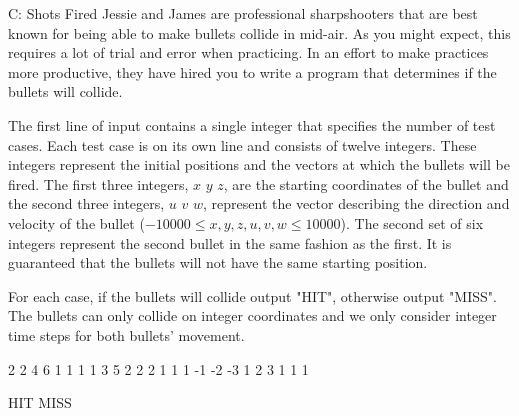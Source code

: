 \begin{problem}{C: Shots Fired}
Jessie and James are professional sharpshooters that are best known for being able to make bullets collide in mid-air.
As you might expect, this requires a lot of trial and error when practicing.
In an effort to make practices more productive, they have hired you to write a program that determines if the bullets will collide.
\end{problem}

\begin{formalin}
The first line of input contains a single integer that specifies the number of test cases.
Each test case is on its own line and consists of twelve integers.
These integers represent the initial positions and the vectors at which the bullets will be fired.
The first three integers, $x$ $y$ $z$, are the starting coordinates of the bullet and the second three integers, $u$ $v$ $w$, represent the vector describing the direction and velocity of the bullet ($-10000 \leq x, y, z, u, v, w \leq 10000$).
The second set of six integers represent the second bullet in the same fashion as the first.
It is guaranteed that the bullets will not have the same starting position.
\end{formalin}

\begin{formalout}
For each case, if the bullets will collide output "HIT", otherwise output "MISS".
The bullets can only collide on integer coordinates and we only consider integer time steps for both bullets' movement. 
\end{formalout}

\begin{datain}
2
2 4 6 1 1 1 1 3 5 2 2 2
1 1 1 -1 -2 -3 1 2 3 1 1 1
\end{datain}

\begin{dataout}
HIT
MISS
\end{dataout}

